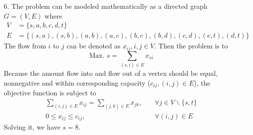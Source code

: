 \documentclass[10pt]{report}
\begin{document}
\begin{enumerate}
	\item [6.]
	The problem can be modeled mathematically as a directed graph $G=(V, E)$ where
	\begin{align*}
		V &= \{s, a, b, c, d, t\}\\
		E &= \{(s, a), (s, b), (a, b), (a, c), (b, c), (b, d), (c, d), (c, t), (d,t)\}
	\end{align*}
	The flow from $i$ to $j$ can be denoted as $x_{ij}, i,j\in V$. Then the problem is to
	\[
	\text{Max. } s = \sum_{(s, i)\in E} x_{si}
	\]
	Because the amount flow into and flow out of a vertex should be equal, nonnegative and within corresponding capacity ($c_{ij}, (i,j)\in E$), the objective function is subject to
	\begin{align*}
		\sum_{(i, j)\in E} x_{ij} =  \sum_{(j, k)\in E} x_{jk},& \quad \forall j\in V\backslash\{s, t\}\\
		0 \le x_{ij} \le c_{ij},& \quad \forall (i,j)\in E
	\end{align*}
	Solving it, we have $s=8$.
\end{enumerate}
\end{document}
